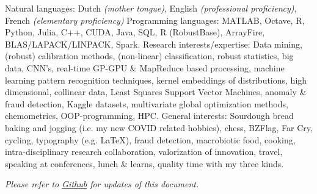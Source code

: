 \documentclass[10pt,a4paper]{article}
\begin{document}
\vspace{0.5em}
\inlineheadsection
{Natural languages:}
{Dutch \emph{(mother tongue)}, English \emph{(professional proficiency)}, French \emph{(elementary proficiency)}}
\vspace{0.5em}
\inlineheadsection
{Programming languages:}
{MATLAB, Octave, R, Python, Julia, C++, CUDA, Java, SQL, R (RobustBase), ArrayFire, BLAS/LAPACK/LINPACK, Spark.}
\vspace{0.5em}
\inlineheadsection	
{Research interests/expertise:}
{Data mining, (robust) calibration methods, (non-linear) classification, robust statistics, big data, CNN's, real-time GP-GPU \& MapReduce based processing, machine learning pattern recognition techniques, kernel embeddings of distributions, high dimensional, collinear data, Least Squares Support Vector Machines, anomaly \& fraud detection, Kaggle datasets, multivariate global optimization methods, chemometrics,  OOP-programming, HPC.}
\vspace{0.5em}
\inlineheadsection	
  {General interests:}
  {Sourdough bread baking and jogging (i.e. my new COVID related hobbies), chess, BZFlag, Far Cry, cycling, typography (e.g. \LaTeX), fraud detection, macrobiotic food, cooking, intra-disciplinary research collaboration, valorization of innovation, travel, speaking at conferences, lunch \& learns, quality time with my three kinds.}

\vspace{+2em} 
\begin{center}
	\emph{\small Please refer to \href{https://github.com/ivranckx/CV_Iwein_Vranckx/blob/main/iwein-vranckx-resume.pdf}{Github} for updates of this document.}
\end{center}
\spacedhrule{-0.2em}{-0.4em}
\end{document}
